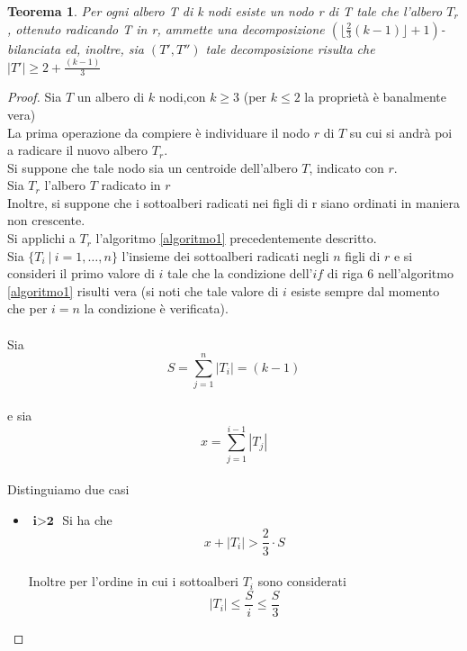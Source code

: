 \newtheorem{teorema1}[definizione]{Teorema}
\begin{teorema1}
	\label{teorema1 cap3 sez1}
Per ogni albero T di k nodi esiste un nodo r di T  tale che l'albero $T_r$, ottenuto radicando T in r, ammette una decomposizione $ (\lfloor \frac{2}{3}(k-1) \rfloor + 1)$-bilanciata ed, inoltre, sia $ (T',T'')$ tale decomposizione risulta che $ |T'| \ge 2+\frac{(k-1)}{3} $
\end{teorema1}\mbox{}
\begin{proof}
	
	Sia $ T $ un albero di $ k $ nodi,con $ k\ge 3 $ (per $k\le2$ la propriet\`a \`e banalmente vera) \\
	La prima operazione da compiere \`e individuare il nodo $ r $ di $ T $ su cui si andr\`a poi a radicare il nuovo albero $ T_r $.\\
	Si suppone che tale nodo sia un centroide dell'albero $ T $, indicato con $ r $.\\
	Sia $ T_r$ l'albero $ T $ radicato in $ r $ \\ 
	Inoltre, si suppone che i sottoalberi radicati nei figli di r siano ordinati in maniera non crescente.\\
	Si applichi a $ T_r $ l'algoritmo \ref{algoritmo1} precedentemente descritto.\\
	Sia $ \{T_i \ | \  i=1,\dots,n\} $ l'insieme dei sottoalberi radicati negli $ n $ figli di $ r $ e si consideri il primo valore di $ i $ tale che la condizione dell'$ if $ di riga $ 6 $ nell'algoritmo \ref{algoritmo1} risulti vera (si noti che tale valore di $ i $ esiste sempre dal momento che per $ i = n $ la condizione \`e verificata).\mbox{}\\\\
	Sia 
	\[ S = \sum_{j=1}^{n}{|T_i|} = (k-1 ) \]\\
	e sia
	\[ x = \sum_{j=1}^{i-1}{|T_j|} \]\\
	Distinguiamo due casi
	\begin{itemize}
	\item $\textbf{ i>2 }$ Si ha che
	\\ 
	\begin{equation}\label{1}
		x+|T_i| > \frac{2}{3}\cdot S
	\end{equation}
\\
	Inoltre per l'ordine in cui i sottoalberi $ T_i $ sono considerati
\\	
	\begin{equation}\label{2}
	|T_i| \le \frac{S}{i} \le \frac{S}{3}	
	\end{equation}

\end{itemize}
\end{proof}

